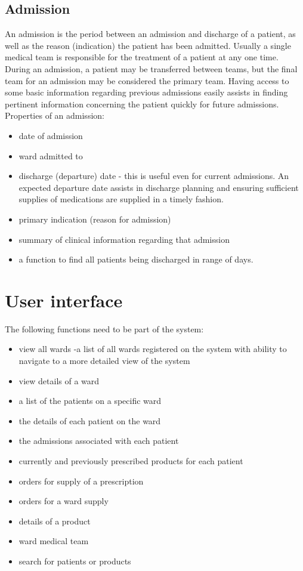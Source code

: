 \documentclass[letterpaper]{amsart}
\begin{document}
\subsection{Admission} An admission is the period between an admission and discharge of a patient, as well as the reason (indication) the patient has been admitted.  Usually a single medical team is responsible for the treatment of a patient at any one time.  During an admission, a patient may be transferred between teams, but the final team for an admission may be considered the primary team.  Having access to some basic information regarding previous admissions easily assists in finding pertinent information concerning the patient quickly for future admissions.   
Properties of an admission:\\
\begin{itemize}
    \item date of admission 
    \item ward admitted to 
    \item discharge (departure) date - this is useful even for current admissions.  An expected departure date assists in discharge planning and ensuring sufficient supplies of medications are supplied in a timely fashion. 
    \item primary indication (reason for admission) 
    \item summary of clinical information regarding that admission 
    \item a function to find all patients being discharged in range of days.
\end{itemize}


\section{User interface}
The following functions need to be part of the system:
\begin{itemize}
    \item view all wards -a list of all wards registered on the system with ability to navigate to a more detailed view of the system
    \item view details of a  ward
    \item a list of the patients on a specific ward
    \item the details of each patient on the ward
    \item the admissions associated with each patient
    \item currently and previously prescribed products for each patient
    \item orders for supply of a prescription
    \item orders for a ward supply
    \item details of a product
    \item ward medical team 
    \item search for patients or products
\end{itemize}
\end{document}
